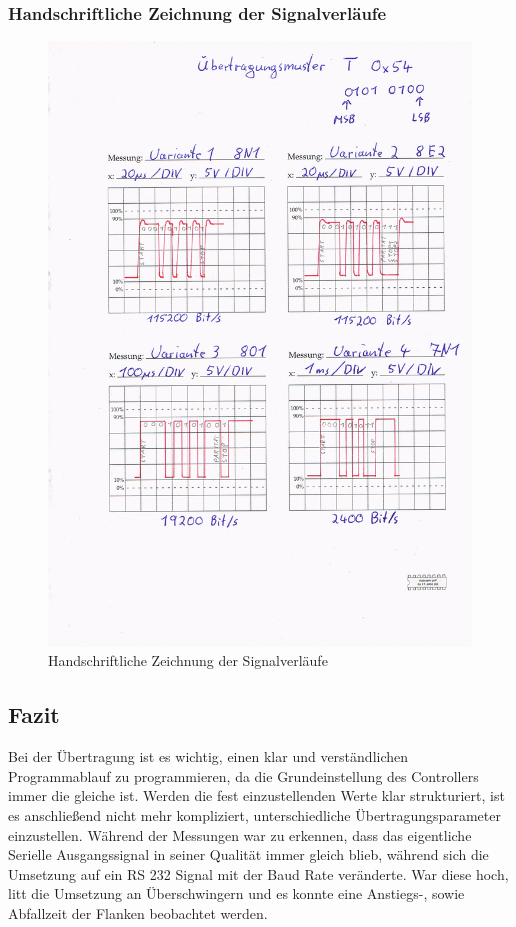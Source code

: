 		\subsubsection{Handschriftliche Zeichnung der Signalverläufe}
	\begin{figure}[H]
\centering
\includegraphics[width=0.8\linewidth]{../Bilder/Oszilloskop_Manuel}
\caption{Handschriftliche Zeichnung der Signalverläufe}
\label{fig:Oszilloskop_Manuel}
\end{figure}

	
	\newpage
	
	\subsection{Fazit}
	
	Bei der Übertragung ist es wichtig, einen klar und verständlichen Programmablauf zu programmieren, da die Grundeinstellung des Controllers immer die gleiche ist. Werden die fest einzustellenden Werte klar strukturiert, ist es anschließend nicht mehr kompliziert, unterschiedliche Übertragungsparameter einzustellen. Während der Messungen war zu erkennen, dass das eigentliche Serielle Ausgangssignal in seiner Qualität immer gleich blieb, während sich die Umsetzung auf ein RS 232 Signal mit der Baud Rate veränderte. War diese hoch, litt die Umsetzung an Überschwingern und es konnte eine Anstiegs-, sowie Abfallzeit der Flanken beobachtet werden.

